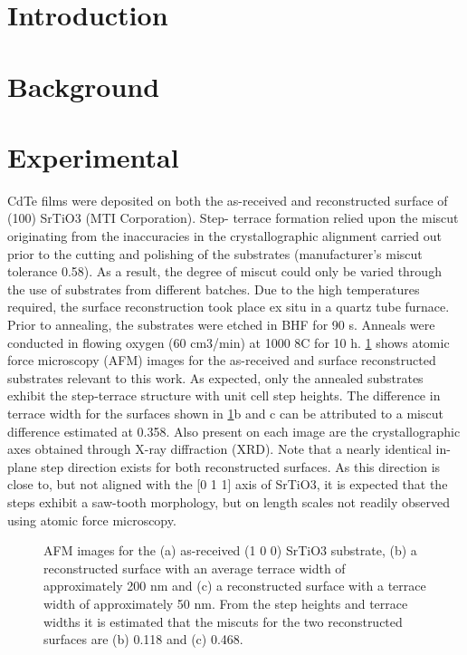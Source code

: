 \section{Introduction}

\section{Background}

\section{Experimental}
CdTe films were deposited on both the as-received and
reconstructed surface of (100) SrTiO3 (MTI Corporation). Step-
terrace formation relied upon the miscut originating from the
inaccuracies in the crystallographic alignment carried out prior to
the cutting and polishing of the substrates (manufacturer’s miscut
tolerance 0.58). As a result, the degree of miscut could only be
varied through the use of substrates from different batches. Due to
the high temperatures required, the surface reconstruction took
place ex situ in a quartz tube furnace. Prior to annealing, the
substrates were etched in BHF for 90 s. Anneals were conducted in
flowing oxygen (60 cm3/min) at 1000 8C for 10 h. \cref{fig:srtio3_sub_afm} shows
atomic force microscopy (AFM) images for the as-received and
surface reconstructed substrates relevant to this work. As
expected, only the annealed substrates exhibit the step-terrace
structure with unit cell step heights. The difference in terrace
width for the surfaces shown in \cref{fig:srtio3_sub_afm}b and c can be attributed to a
miscut difference estimated at 0.358. Also present on each image
are the crystallographic axes obtained through X-ray diffraction
(XRD). Note that a nearly identical in-plane step direction exists for
both reconstructed surfaces. As this direction is close to, but not
aligned with the [0 1 1] axis of SrTiO3, it is expected that the steps
exhibit a saw-tooth morphology, but on length scales not readily
observed using atomic force microscopy.
\begin{figure}
    \centering
    \caption{\label{fig:srtio3_sub_afm}AFM images for the (a) as-received (1 0 0) SrTiO3 substrate, (b) a reconstructed surface with an average terrace width of approximately 200 nm and (c) a reconstructed
        surface with a terrace width of approximately 50 nm. From the step heights and terrace widths it is estimated that the miscuts for the two reconstructed surfaces are (b) 0.118\degree
        and (c) 0.468\degree.}
\end{figure}

